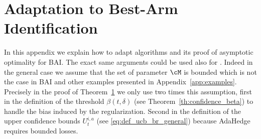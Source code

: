 \section{Adaptation to Best-Arm Identification}

In this appendix we explain how to adapt algorithms \LGC and its proof of asymptotic optimality for BAI. The exact same arguments could be used also for \LG. Indeed in the general case we assume that the set of parameter $\cM$ is bounded which is not the case in BAI and other examples presented in Appendix~\ref{app:examples}. Precisely in the proof of Theorem~\ref{} we only use two times this assumption, first in the definition of the threshold $\beta(t,\delta)$ (see Theorem~\ref{th:confidence_beta}) to handle the bias induced by the regularization. Second in the definition of the upper confidence bounds $U^{i,a}_t$ (see \eqref{eq:def_ucb_br_general}) because AdaHedge requires bounded losses.


